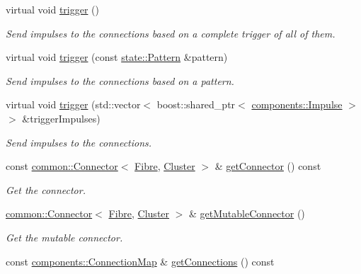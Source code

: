 \begin{DoxyCompactItemize}
virtual void \hyperlink{classcryomesh_1_1structures_1_1Fibre_ac92cf661269915725e52f33b02ec05c7}{trigger} ()
\begin{DoxyCompactList}\small\item\em \-Send impulses to the connections based on a complete trigger of all of them. \end{DoxyCompactList}\item 
virtual void \hyperlink{classcryomesh_1_1structures_1_1Fibre_afa6b0d36b541f7ab94d80de2d3222536}{trigger} (const \hyperlink{classcryomesh_1_1state_1_1Pattern}{state\-::\-Pattern} \&pattern)
\begin{DoxyCompactList}\small\item\em \-Send impulses to the connections based on a pattern. \end{DoxyCompactList}\item 
virtual void \hyperlink{classcryomesh_1_1structures_1_1Fibre_a09cd16b434cac26865e349f09a59f874}{trigger} (std\-::vector$<$ boost\-::shared\-\_\-ptr$<$ \hyperlink{classcryomesh_1_1components_1_1Impulse}{components\-::\-Impulse} $>$ $>$ \&trigger\-Impulses)
\begin{DoxyCompactList}\small\item\em \-Send impulses to the connections. \end{DoxyCompactList}\item 
const \hyperlink{classcryomesh_1_1common_1_1Connector}{common\-::\-Connector}$<$ \hyperlink{classcryomesh_1_1structures_1_1Fibre}{\-Fibre}, \*
\hyperlink{classcryomesh_1_1structures_1_1Cluster}{\-Cluster} $>$ \& \hyperlink{classcryomesh_1_1structures_1_1Fibre_aac08e0b13a4baffd2c74d8d1a3351072}{get\-Connector} () const 
\begin{DoxyCompactList}\small\item\em \-Get the connector. \end{DoxyCompactList}\item 
\hyperlink{classcryomesh_1_1common_1_1Connector}{common\-::\-Connector}$<$ \hyperlink{classcryomesh_1_1structures_1_1Fibre}{\-Fibre}, \*
\hyperlink{classcryomesh_1_1structures_1_1Cluster}{\-Cluster} $>$ \& \hyperlink{classcryomesh_1_1structures_1_1Fibre_ab38093272e6e7427b21bb6eb4ded1778}{get\-Mutable\-Connector} ()
\begin{DoxyCompactList}\small\item\em \-Get the mutable connector. \end{DoxyCompactList}\item 
const \hyperlink{classcryomesh_1_1components_1_1ConnectionMap}{components\-::\-Connection\-Map} \& \hyperlink{classcryomesh_1_1structures_1_1Fibre_a95dbfb506308cab9c4d763f2dff66311}{get\-Connections} () const 

\end{DoxyCompactItemize}
